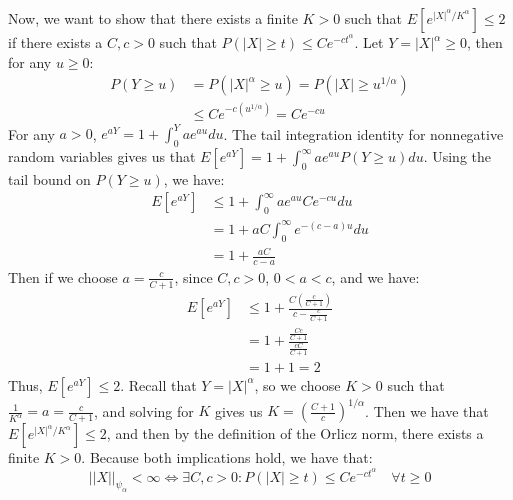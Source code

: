 \documentclass[11pt,a4paper,margin=1in]{article}
\begin{document}
\noindent
Now, we want to show that there exists a finite $K > 0$ such that $E[e^{|X|^\alpha/K^\alpha}] \leq 2$ 
if there exists a $C, c > 0$ such that $P(|X| \geq t) \leq C e^{-ct^\alpha}$. Let
$Y = |X|^\alpha \geq 0$, then for any $u \geq 0$:
\begin{align*}
    P(Y \geq u) &= P(|X|^\alpha \geq u) = P(|X| \geq u^{1/\alpha}) \\
    &\leq C e^{-c(u^{1/\alpha})} = C e^{-c u}
\end{align*}
For any $a > 0$, $e^{aY} = 1 + \int_0^Y a e^{au} du$. The tail integration identity
for nonnegative random variables gives us that $E[e^{aY}] = 1 + \int_0^\infty a e^{au} P(Y \geq u) du$. 
Using the tail bound on $P(Y \geq u)$, we have:
\begin{align*}
    E[e^{aY}] &\leq 1 + \int_0^\infty a e^{au} C e^{-cu} du \\
    &= 1 + aC \int_0^\infty e^{-(c - a)u} du \\
    &= 1 + \frac{aC}{c - a}
\end{align*}
Then if we choose $a = \frac{c}{C + 1}$, since $C, c > 0$, $0 < a < c$, and we have:
\begin{align*}
    E[e^{aY}] &\leq 1 + \frac{C(\frac{c}{C + 1})}{c - \frac{c}{C + 1}} \\
    &= 1 + \frac{\frac{Cc}{C + 1}}{\frac{cC}{C + 1}} \\
    &= 1 + 1 = 2
\end{align*}
Thus, $E[e^{aY}] \leq 2$. Recall that $Y = |X|^\alpha$, so we choose $K > 0$
such that $\frac{1}{K^\alpha} = a = \frac{c}{C + 1}$, and solving for $K$
gives us $K = \left(\frac{C + 1}{c}\right)^{1/\alpha}$. Then we have that
$E[e^{|X|^\alpha/K^\alpha}] \leq 2$, and then by the definition of the Orlicz norm,
there exists a finite $K > 0$. Because both implications hold, we have that:
\[
    ||X||_{\psi_\alpha} < \infty \iff \exists C, c > 0 : P(|X| \geq t) \leq C e^{-ct^\alpha} \quad \forall t \geq 0
\]
\end{document}
